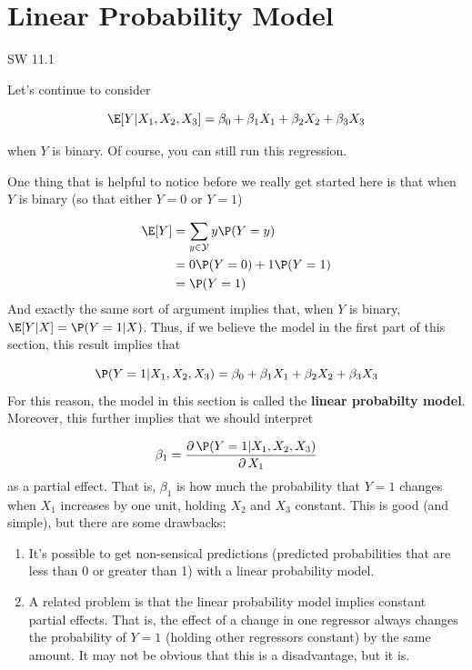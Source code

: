 \documentclass[
  letterpaper,
  DIV=11,
  numbers=noendperiod]{scrreprt}
\begin{document}
\section{Linear Probability Model}\label{linear-probability-model}

SW 11.1

Let's continue to consider

\[
  \E[Y|X_1,X_2,X_3] = \beta_0 + \beta_1 X_1 + \beta_2 X_2 + \beta_3 X_3
\]

when \(Y\) is binary. Of course, you can still run this regression.

One thing that is helpful to notice before we really get started here is
that when \(Y\) is binary (so that either \(Y=0\) or \(Y=1\))

\[
  \begin{aligned}
  \E[Y] &= \sum_{y \in \mathcal{Y}} y \P(Y=y) \\
  &= 0 \P(Y=0) + 1 \P(Y=1) \\
  &= \P(Y=1)
  \end{aligned}
\] And exactly the same sort of argument implies that, when \(Y\) is
binary, \(\E[Y|X] = \P(Y=1|X)\). Thus, if we believe the model in the
first part of this section, this result implies that

\[
  \P(Y=1|X_1,X_2,X_3) = \beta_0 + \beta_1 X_1 + \beta_2 X_2 + \beta_3 X_3
\] For this reason, the model in this section is called the
\textbf{linear probabilty model}. Moreover, this further implies that we
should interpret

\[
  \beta_1 = \frac{\partial \, \P(Y=1|X_1,X_2,X_3)}{\partial \, X_1}
\] as a partial effect. That is, \(\beta_1\) is how much the probability
that \(Y=1\) changes when \(X_1\) increases by one unit, holding \(X_2\)
and \(X_3\) constant. This is good (and simple), but there are some
drawbacks:

\begin{enumerate}
\def\labelenumi{\arabic{enumi}.}
\item
  It's possible to get non-sensical predictions (predicted probabilities
  that are less than 0 or greater than 1) with a linear probability
  model.
\item
  A related problem is that the linear probability model implies
  constant partial effects. That is, the effect of a change in one
  regressor always changes the probability of \(Y=1\) (holding other
  regressors constant) by the same amount. It may not be obvious that
  this is a disadvantage, but it is.
\end{enumerate}
\end{document}

